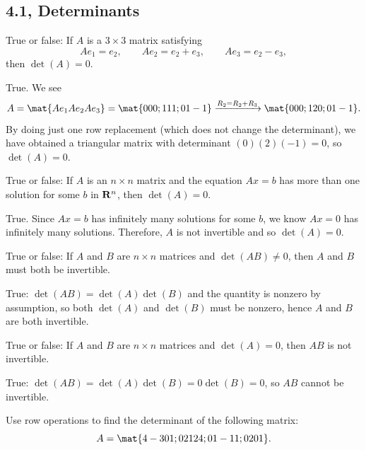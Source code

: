 


\subsection{4.1, Determinants}

\begin{problems}

\problem %
True or false: If $A$ is a $3 \times 3$ matrix satisfying
\[Ae_1 = e_2, \qquad Ae_2 = e_2 + e_3, \qquad Ae_3 = e_2-e_3,\] then
$\det(A) = 0$.

\begin{solution}
True.  We see
    \[A = \mat{Ae_1 Ae_2 Ae_3} = \mat{0 0 0; 1 1 1; 0 1 -1}
      \xrightarrow[]{R_2 = R_2 + R_3} \mat{0 0 0; 1 2 0; 0 1 -1}.\] By
    doing just one row replacement (which does not change the
    determinant), we have obtained a triangular matrix with
    determinant $(0)(2)(-1)=0$, so $\det(A) = 0$.
\end{solution} 

\problem %
True or false: If $A$ is an $n \times n$ matrix and the equation $Ax = b$ has
more than one solution for some $b$ in ${\bf R}^n$, then $\det(A) = 0$.

\begin{solution}
  True.  Since $Ax=b$ has infinitely many solutions for some $b$, we know $Ax=0$
  has infinitely many solutions.  Therefore, $A$ is not invertible and so
  $\det(A)=0$.
\end{solution} 

\problem %
True or false: If $A$ and $B$ are $n \times n$ matrices and $\det(AB) \neq 0$,
then $A$ and $B$ must both be invertible.

\begin{solution}
  True: $\det(AB) = \det(A)\det(B)$ and the quantity is nonzero by assumption,
  so both $\det(A)$ and $\det(B)$ must be nonzero, hence $A$ and $B$ are both
  invertible.
\end{solution} 

\problem %
True or false: If $A$ and $B$ are $n \times n$ matrices and $\det(A)=0$, then
$AB$ is not invertible.

\begin{solution}
  True: $\det(AB) = \det(A) \det(B) = 0 \det(B) = 0$, so $AB$ cannot be
  invertible.
\end{solution} 



\problem %
Use row operations to find the determinant of the following matrix:
\[A = \mat{4 -3 0 1; 0 2 12 4; 0 1 -1 1; 0 2 0 1}.\]


\end{problems}
